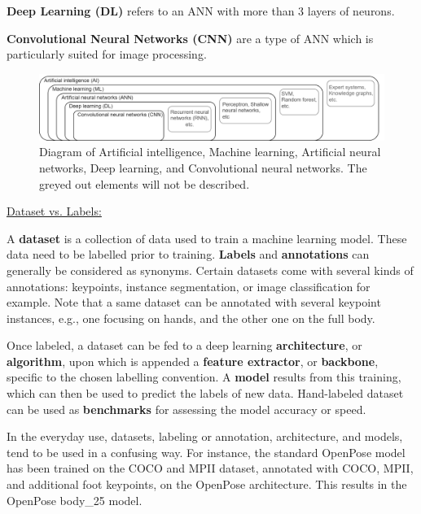 \textbf{Deep Learning (DL)} refers to an ANN with more than 3 layers of neurons.

\textbf{Convolutional Neural Networks (CNN)} are a type of ANN which is particularly suited for image processing.

\begin{figure}[hbtp]
	\centering
            \def\svgwidth{1\columnwidth}
            \fontsize{10pt}{10pt}\selectfont
            \includegraphics[width=\linewidth]{"../Annexes/Figures/AI_CNN_etc.png"}
            \caption{Diagram of Artificial intelligence, Machine learning, Artificial neural networks, Deep learning, and Convolutional neural networks. The greyed out elements will not be described.}
            \label{fig_ai}
\end{figure}
\FloatBarrier
\vspace*{0.5cm}

\noindent\underline{Dataset vs. Labels: }

A \textbf{dataset} is a collection of data used to train a machine learning model. These data need to be labelled prior to training. \textbf{Labels} and \textbf{annotations} can generally be considered as synonyms. Certain datasets come with several kinds of annotations: keypoints, instance segmentation, or image classification for example. Note that a same dataset can be annotated with several keypoint instances, e.g., one focusing on hands, and the other one on the full body.

Once labeled, a dataset can be fed to a deep learning \textbf{architecture}, or \textbf{algorithm}, upon which is appended a \textbf{feature extractor}, or \textbf{backbone}, specific to the chosen labelling convention. A \textbf{model} results from this training, which can then be used to predict the labels of new data. Hand-labeled dataset can be used as \textbf{benchmarks} for assessing the model accuracy or speed. 

In the everyday use, datasets, labeling or annotation, architecture, and models, tend to be used in a confusing way. For instance, the standard OpenPose model has been trained on the COCO and MPII dataset, annotated with COCO, MPII, and additional foot keypoints, on the OpenPose architecture. This results in the OpenPose body\_25 model. 

